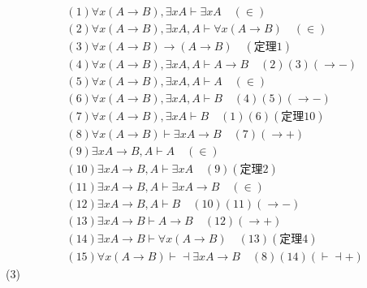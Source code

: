 \documentclass{article}
\begin{document}
\[
\begin{aligned}
&(1)\forall x (A \to B), \exists x A \vdash \exists x A \quad (\in) \\
&(2)\forall x (A \to B), \exists x A, A \vdash \forall x (A \to B) \quad (\in) \\
&(3)\forall x (A \to B) \to (A \to B) \quad (\mbox{定理}1) \\
&(4)\forall x (A \to B), \exists x A, A \vdash A \to B \quad (2)(3)(\to -) \\
&(5)\forall x (A \to B), \exists x A, A \vdash A \quad (\in) \\
&(6)\forall x (A \to B), \exists x A, A \vdash B \quad (4)(5)(\to -) \\
&(7)\forall x (A \to B), \exists x A \vdash B \quad (1)(6)(\mbox{定理}10) \\
&(8)\forall x (A \to B) \vdash \exists x A \to B  \quad (7)(\to +) \\
&(9)\exists x A \to B, A \vdash A \quad (\in) \\
&(10)\exists x A \to B, A \vdash \exists x A \quad (9)(\mbox{定理}2) \\
&(11)\exists x A \to B, A \vdash \exists x A \to B \quad (\in) \\
&(12)\exists x A \to B, A \vdash B \quad (10)(11)(\to -) \\
&(13)\exists x A \to B \vdash A \to B \quad (12)(\to +) \\
&(14)\exists x A \to B \vdash \forall x (A \to B) \quad (13)(\mbox{定理}4) \\
&(15)\forall x (A \to B) \vdash \dashv \exists x A \to B \quad (8)(14)(\vdash \dashv  +)
\end{aligned}
\]
(3)
\end{document}
